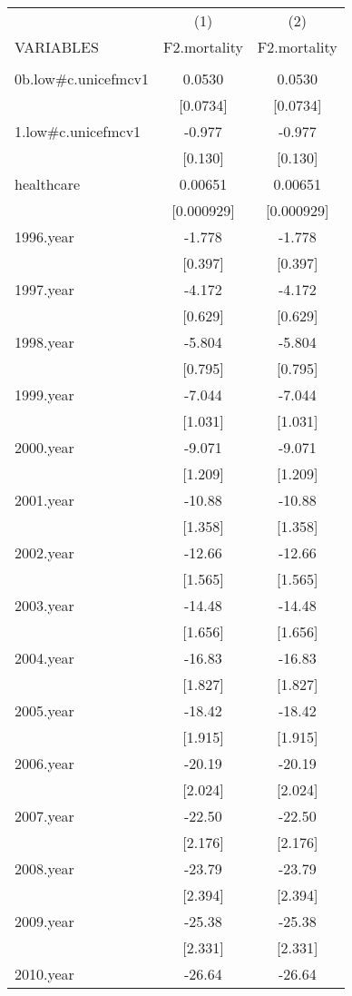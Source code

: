 \documentclass[]{article}
\begin{document}
\begin{tabular}{lcc} \hline
 & (1) & (2) \\
VARIABLES & F2.mortality & F2.mortality \\ \hline
 &  &  \\
0b.low\#c.unicefmcv1 & 0.0530 & 0.0530 \\
 & [0.0734] & [0.0734] \\
1.low\#c.unicefmcv1 & -0.977 & -0.977 \\
 & [0.130] & [0.130] \\
healthcare & 0.00651 & 0.00651 \\
 & [0.000929] & [0.000929] \\
1996.year & -1.778 & -1.778 \\
 & [0.397] & [0.397] \\
1997.year & -4.172 & -4.172 \\
 & [0.629] & [0.629] \\
1998.year & -5.804 & -5.804 \\
 & [0.795] & [0.795] \\
1999.year & -7.044 & -7.044 \\
 & [1.031] & [1.031] \\
2000.year & -9.071 & -9.071 \\
 & [1.209] & [1.209] \\
2001.year & -10.88 & -10.88 \\
 & [1.358] & [1.358] \\
2002.year & -12.66 & -12.66 \\
 & [1.565] & [1.565] \\
2003.year & -14.48 & -14.48 \\
 & [1.656] & [1.656] \\
2004.year & -16.83 & -16.83 \\
 & [1.827] & [1.827] \\
2005.year & -18.42 & -18.42 \\
 & [1.915] & [1.915] \\
2006.year & -20.19 & -20.19 \\
 & [2.024] & [2.024] \\
2007.year & -22.50 & -22.50 \\
 & [2.176] & [2.176] \\
2008.year & -23.79 & -23.79 \\
 & [2.394] & [2.394] \\
2009.year & -25.38 & -25.38 \\
 & [2.331] & [2.331] \\
2010.year & -26.64 & -26.64 \\

\end{tabular}
\end{document}

